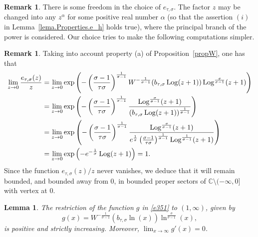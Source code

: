 \documentclass[12pt,leqno]{amsart}
\theoremstyle{plain}
\newtheorem{lemma}[theo]{Lemma}
\theoremstyle{definition}
\newtheorem{rem}[theo]{Remark}
\numberwithin{equation}{section}
\def\a{\alpha}
\def\Log{\mathop{\rm Log}\nolimits}
\begin{document}
\begin{rem}
There is some freedom in the choice of $e_{\tau,\sigma}$. The factor $z$ may be changed into any $z^{\alpha}$ for some positive real number $\a$ (so that the assertion $(i)$ in Lemma~\ref{lema.Properties.e_h} holds true), where the principal branch of the power is considered. Our choice tries to make the following computations simpler.
\end{rem}


\begin{rem}\label{rem.e_h_boundedat0}
Taking into account property (a) of Proposition~\ref{propW}, one has that
\begin{align*}
\lim_{z\to 0}\frac{e_{\tau,\sigma}(z)}{z}&=\lim_{z\to 0}\exp\left(-\left(\frac{\sigma-1}{\tau\sigma}\right)^{\frac{1}{\sigma-1}} W^{-\frac{1}{\sigma-1}}(b_{\tau,\sigma}\Log(z+1))\Log^{\frac{\sigma}{\sigma-1}}(z+1)\right)\\
&=\lim_{z\to 0}\exp\left(-\left(\frac{\sigma-1}{\tau\sigma}\right)^{\frac{1}{\sigma-1}} \frac{\Log^{\frac{\sigma}{\sigma-1}}(z+1)}{(b_{\tau,\sigma}\Log(z+1))^{\frac{1}{\sigma-1}}}\right)\\
&=\lim_{z\to 0}\exp\left(-\left(\frac{\sigma-1}{\tau\sigma}\right)^{\frac{1}{\sigma-1}} \frac{\Log^{\frac{\sigma}{\sigma-1}}(z+1)}{e^{\frac{1}{\sigma}} \left(\frac{\sigma-1}{\tau\sigma}\right)^{\frac{1}{\sigma-1}} \Log^{\frac{1}{\sigma-1}}(z+1)}\right)\\
&=\lim_{z\to 0}\exp\left(-e^{-\frac{1}{\sigma}}
\Log(z+1)\right)=1.
\end{align*}
Since the function $e_{\tau,\sigma}(z)/z$ never vanishes, we deduce that it will remain bounded, and bounded away from 0, in bounded proper sectors of $\mathbb{C}\setminus(-\infty,0]$ with vertex at 0.
\end{rem}


\begin{lemma}\label{lema.g_hincreasing}
The restriction of the function $g$ in \eqref{e351} to $(1,\infty)$, given by
\begin{equation}\label{eq.defi.g_h_reals}
g(x)=W^{-\frac{1}{\sigma-1}}(b_{\tau,\sigma}\ln(x)) \ln^{\frac{\sigma}{\sigma-1}}(x),
\end{equation}
is positive and strictly increasing. Moreover, $\lim_{x\to\infty}g'(x)=0$.
\end{lemma}
\end{document}
